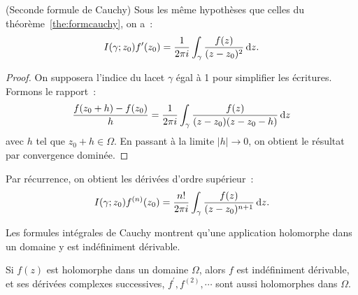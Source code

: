  \begin{fthm}(Seconde formule
de Cauchy) Sous les même hypothèses que celles du théorème~\ref{the:formcauchy}, on a~:
\[
I(\gamma; z_0) f^\prime(z_0) = \frac{1}{2 \pi i} \int_{\gamma}
\frac{f(z)}{(z-z_0)^2}\mathop{}\mathopen{}\mathrm{d} z.
\]
\end{fthm}

\begin{proof}
On supposera l'indice du lacet $\gamma$ égal à 1 pour simplifier les écritures.
Formons le rapport~:
\[
\frac{f(z_0+h)-f(z_0)}{h} = \frac{1}{2
\pi i}\int_{\gamma}\frac{f(z)}{(z-z_0)(z-z_0-h)} \mathop{}\mathopen{}\mathrm{d} z
\]
avec $h$ tel que $z_0+h \in \Omega$. En passant à la limite $|h|\to 0$, on
obtient le résultat par convergence dominée.
\end{proof}

Par récurrence, on obtient les dérivées d'ordre supérieur~:
\[
I(\gamma; z_0) f^{(n)}(z_0) = \frac{n!}{2 \pi i} \int_{\gamma}
\frac{f(z)}{(z-z_0)^{n+1}} \mathop{}\mathopen{}\mathrm{d} z.
\]


Les formules intégrales de Cauchy montrent qu'une application holomorphe dans un
domaine y est indéfiniment dérivable. 

\begin{fcor}
Si $f(z)$ est holomorphe dans un domaine $\Omega$, alors $f$ est indéfiniment dérivable, et ses dérivées complexes successives, $f^\prime, f^{(2)}, \cdots$ sont aussi holomorphes dans $\Omega$.
\end{fcor}



